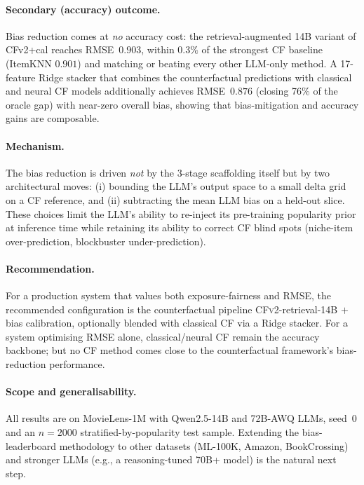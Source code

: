 \documentclass[11pt,a4paper]{article}
\begin{document}
\paragraph{Secondary (accuracy) outcome.} Bias reduction comes at
\emph{no} accuracy cost: the retrieval-augmented 14B variant of CFv2+cal
reaches RMSE~$0.903$, within $0.3\%$ of the strongest CF baseline
(ItemKNN $0.901$) and matching or beating every other LLM-only method.
A 17-feature Ridge stacker that combines the counterfactual predictions
with classical and neural CF models additionally achieves RMSE~$0.876$
(closing 76\% of the oracle gap) with near-zero overall bias, showing
that bias-mitigation and accuracy gains are composable.

\paragraph{Mechanism.} The bias reduction is driven \emph{not} by the
3-stage scaffolding itself but by two architectural moves: (i) bounding
the LLM's output space to a small delta grid on a CF reference, and
(ii) subtracting the mean LLM bias on a held-out slice. These choices
limit the LLM's ability to re-inject its pre-training popularity prior
at inference time while retaining its ability to correct CF blind spots
(niche-item over-prediction, blockbuster under-prediction).

\paragraph{Recommendation.} For a production system that values both
exposure-fairness and RMSE, the recommended configuration is the
counterfactual pipeline \textsc{CFv2}-retrieval-14B $+$ bias
calibration, optionally blended with classical CF via a Ridge stacker.
For a system optimising RMSE alone, classical/neural CF remain the
accuracy backbone; but no CF method comes close to the counterfactual
framework's bias-reduction performance.

\paragraph{Scope and generalisability.} All results are on MovieLens-1M
with Qwen2.5-14B and 72B-AWQ LLMs, seed~0 and an $n{=}2000$
stratified-by-popularity test sample. Extending the bias-leaderboard
methodology to other datasets (ML-100K, Amazon, BookCrossing) and
stronger LLMs (e.g., a reasoning-tuned 70B+ model) is the natural next
step.
\end{document}
